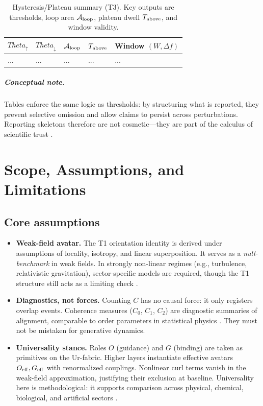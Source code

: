 \documentclass[12pt,a4paper,oneside]{scrreprt}
\def\Theta{Theta}%
\begin{document}
\begin{table}[htbp]\centering
\caption{Hysteresis/Plateau summary (T3). Key outputs are thresholds, loop area $\mathcal A_{\rm loop}$, plateau dwell $T_{\rm above}$, and window validity.}
\begin{tabular}{lllll}\toprule
$\Theta_\uparrow$ & $\Theta_\downarrow$ & $\mathcal A_{\rm loop}$ & $T_{\rm above}$ & Window $(W,\Delta f)$ \\\midrule
... & ... & ... & ... & ...\\ \bottomrule
\end{tabular}
\end{table}

\paragraph{Conceptual note.}
Tables enforce the same logic as thresholds: by structuring what is reported, they prevent selective omission and allow claims to persist across perturbations. Reporting skeletons therefore are not cosmetic—they are part of the calculus of scientific trust \cite{Munafò2017,Ioannidis2005}.

\chapter{Scope, Assumptions, and Limitations}\label{app:limits}

\section*{Core assumptions}
\begin{itemize}
\item \textbf{Weak-field avatar.}  
The T1 orientation identity is derived under assumptions of locality, isotropy, and linear superposition. It serves as a \emph{null-benchmark} in weak fields. In strongly non-linear regimes (e.g., turbulence, relativistic gravitation), sector-specific models are required, though the T1 structure still acts as a limiting check \cite{Jackson1998,Thorne2017}.

\item \textbf{Diagnostics, not forces.}  
Counting $C$ has no causal force: it only registers overlap events. Coherence measures ($C_0$, $C_1$, $C_2$) are diagnostic summaries of alignment, comparable to order parameters in statistical physics \cite{Goldenfeld1992,Sethna2006}. They must not be mistaken for generative dynamics.

\item \textbf{Universality stance.}  
Roles $O$ (guidance) and $G$ (binding) are taken as primitives on the Ur-fabric. Higher layers instantiate effective avatars $O_{\rm eff}, G_{\rm eff}$ with renormalized couplings. Nonlinear curl terms vanish in the weak-field approximation, justifying their exclusion at baseline. Universality here is methodological: it supports comparison across physical, chemical, biological, and artificial sectors \cite{Anderson1972,Wilson1979}.
\end{itemize}
\end{document}
